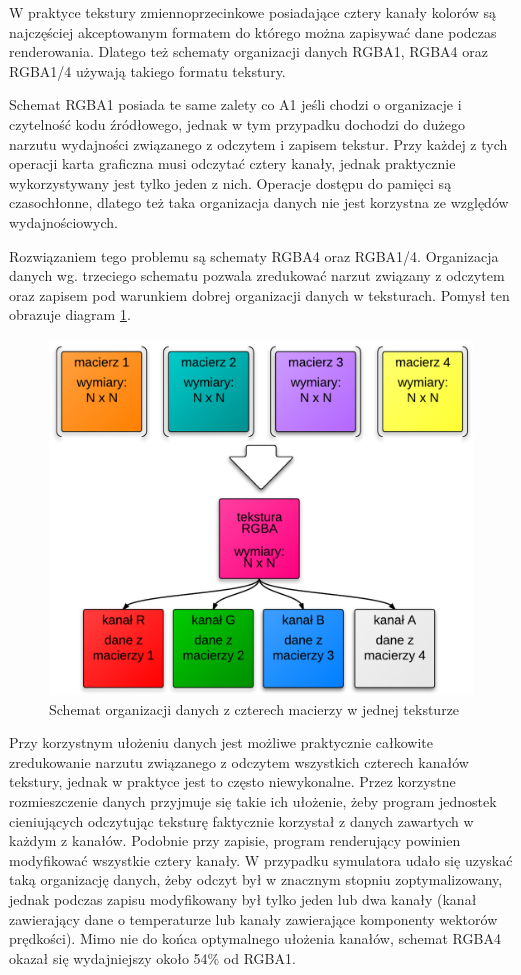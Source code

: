 W praktyce tekstury zmiennoprzecinkowe posiadające cztery kanały kolorów są
najczęściej akceptowanym formatem do którego można zapisywać dane podczas
renderowania. Dlatego też schematy organizacji danych RGBA1, RGBA4 oraz RGBA1/4
używają takiego formatu tekstury.

Schemat RGBA1 posiada te same zalety co A1 jeśli chodzi o organizacje i
czytelność kodu źródłowego, jednak w tym przypadku dochodzi do dużego narzutu
wydajności związanego z odczytem i zapisem tekstur. Przy każdej z tych operacji
karta graficzna musi odczytać cztery kanały, jednak praktycznie wykorzystywany
jest tylko jeden z nich. Operacje dostępu do pamięci są czasochłonne, dlatego
też taka organizacja danych nie jest korzystna ze względów wydajnościowych.

Rozwiązaniem tego problemu są schematy RGBA4 oraz RGBA1/4. Organizacja danych
wg. trzeciego schematu pozwala zredukować narzut związany z odczytem oraz
zapisem pod warunkiem dobrej organizacji danych w teksturach. Pomysł ten
obrazuje diagram \ref{fig:rgba4Tex}. 

\begin{figure}[!h]
\centering
\includegraphics[width=.65\textwidth]{img/rgba4Tex}
\caption{Schemat organizacji danych z czterech macierzy w jednej teksturze}
\label{fig:rgba4Tex}
\end{figure}

Przy korzystnym ułożeniu danych jest możliwe praktycznie całkowite zredukowanie
narzutu związanego z odczytem wszystkich czterech kanałów tekstury, jednak w
praktyce jest to często niewykonalne. Przez korzystne rozmieszczenie danych
przyjmuje się takie ich ułożenie, żeby program jednostek cieniujących odczytując
teksturę faktycznie korzystał z danych zawartych w każdym z kanałów. Podobnie
przy zapisie, program renderujący powinien modyfikować wszystkie cztery kanały.
W przypadku symulatora  udało się uzyskać taką organizację danych,
żeby odczyt był w znacznym stopniu zoptymalizowany, jednak podczas zapisu
modyfikowany był tylko jeden lub dwa kanały (kanał zawierający dane o
temperaturze lub kanały zawierające komponenty wektorów prędkości). Mimo nie do
końca optymalnego ułożenia kanałów, schemat RGBA4 okazał się wydajniejszy około
54\% od RGBA1.

